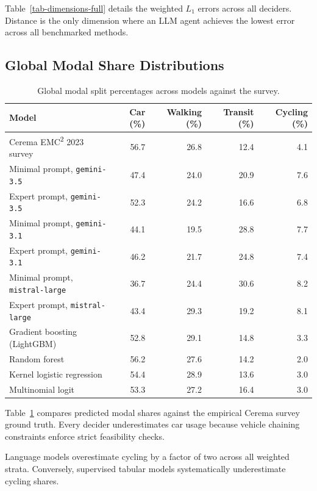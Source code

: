 Table~\ref{tab-dimensions-full} details the weighted $L_1$ errors across all deciders. Distance is the only dimension where an LLM agent achieves the lowest error across all benchmarked methods.



\subsection{Global Modal Share Distributions}

\begin{table}[tp]
  \caption{Global modal split percentages across models against the survey.}
  \label{tab-shares-full}
  \begin{tabular}{lrrrr}
    \toprule
    Model & Car (\%) & Walking (\%) & Transit (\%) & Cycling (\%) \\
    \midrule
    Cerema EMC\textsuperscript{2} 2023 survey & 56.7 & 26.8 & 12.4 & 4.1 \\
    \midrule
    Minimal prompt, \texttt{gemini-3.5} & 47.4 & 24.0 & 20.9 & 7.6 \\
    Expert prompt, \texttt{gemini-3.5}  & 52.3 & 24.2 & 16.6 & 6.8 \\
    Minimal prompt, \texttt{gemini-3.1} & 44.1 & 19.5 & 28.8 & 7.7 \\
    Expert prompt, \texttt{gemini-3.1}  & 46.2 & 21.7 & 24.8 & 7.4 \\
    Minimal prompt, \texttt{mistral-large} & 36.7 & 24.4 & 30.6 & 8.2 \\
    Expert prompt, \texttt{mistral-large}  & 43.4 & 29.3 & 19.2 & 8.1 \\
    \midrule
    Gradient boosting (LightGBM)        & 52.8 & 29.1 & 14.8 & 3.3 \\
    Random forest                       & 56.2 & 27.6 & 14.2 & 2.0 \\
    Kernel logistic regression          & 54.4 & 28.9 & 13.6 & 3.0 \\
    Multinomial logit                   & 53.3 & 27.2 & 16.4 & 3.0 \\
    \bottomrule
  \end{tabular}
\end{table}

Table~\ref{tab-shares-full} compares predicted modal shares against the empirical Cerema survey ground truth. Every decider underestimates car usage because vehicle chaining constraints enforce strict feasibility checks.

Language models overestimate cycling by a factor of two across all weighted strata. Conversely, supervised tabular models systematically underestimate cycling shares.



